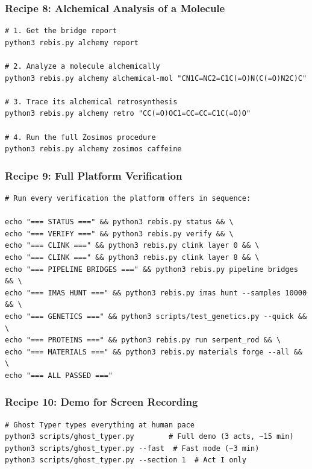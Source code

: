 \hypertarget{recipe-8-alchemical-analysis-of-a-molecule}{%
\subsubsection{Recipe 8: Alchemical Analysis of a
Molecule}\label{recipe-8-alchemical-analysis-of-a-molecule}}

\begin{verbatim}
# 1. Get the bridge report
python3 rebis.py alchemy report

# 2. Analyze a molecule alchemically
python3 rebis.py alchemy alchemical-mol "CN1C=NC2=C1C(=O)N(C(=O)N2C)C"

# 3. Trace its alchemical retrosynthesis
python3 rebis.py alchemy retro "CC(=O)OC1=CC=CC=C1C(=O)O"

# 4. Run the full Zosimos procedure
python3 rebis.py alchemy zosimos caffeine
\end{verbatim}

\hypertarget{recipe-9-full-platform-verification}{%
\subsubsection{Recipe 9: Full Platform
Verification}\label{recipe-9-full-platform-verification}}

\begin{verbatim}
# Run every verification the platform offers in sequence:

echo "=== STATUS ===" && python3 rebis.py status && \
echo "=== VERIFY ===" && python3 rebis.py verify && \
echo "=== CLINK ===" && python3 rebis.py clink layer 0 && \
echo "=== CLINK ===" && python3 rebis.py clink layer 8 && \
echo "=== PIPELINE BRIDGES ===" && python3 rebis.py pipeline bridges && \
echo "=== IMAS HUNT ===" && python3 rebis.py imas hunt --samples 10000 && \
echo "=== GENETICS ===" && python3 scripts/test_genetics.py --quick && \
echo "=== PROTEINS ===" && python3 rebis.py run serpent_rod && \
echo "=== MATERIALS ===" && python3 rebis.py materials forge --all && \
echo "=== ALL PASSED ==="
\end{verbatim}

\hypertarget{recipe-10-demo-for-screen-recording}{%
\subsubsection{Recipe 10: Demo for Screen
Recording}\label{recipe-10-demo-for-screen-recording}}

\begin{verbatim}
# Ghost Typer types everything at human pace
python3 scripts/ghost_typer.py        # Full demo (3 acts, ~15 min)
python3 scripts/ghost_typer.py --fast  # Fast mode (~3 min)
python3 scripts/ghost_typer.py --section 1  # Act I only
\end{verbatim}

